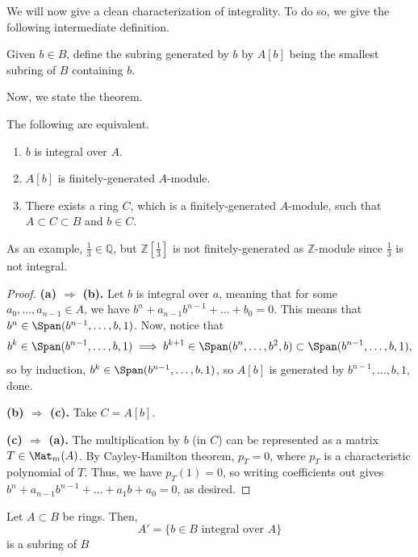 We will now give a clean characterization of integrality.
To do so, we give the following intermediate definition.
\begin{definition}
    Given $b\in B$, define the subring generated by $b$
    by $A[b]$ being the smallest subring of $B$ containing $b$.
\end{definition}
Now, we state the theorem.
\begin{theorem}
    \label{thm:integral_elements}
    The following are equivalent.
    \begin{enumerate}[label=(\alph*)]
	\item $b$ is integral over $A$.
	\item $A[b]$ is finitely-generated $A$-module.
	\item There exists a ring $C$, which is 
	    a finitely-generated $A$-module, such that
	    $A\subset C\subset B$ and $b\in C$.
    \end{enumerate}
\end{theorem}
As an example, $\frac 13\in\mathbb Q$,
but $\mathbb Z\left[\frac 13\right]$ is not
finitely-generated as $\mathbb Z$-module since $\frac 13$
is not integral.
\begin{proof}
    \textbf{(a) $\Rightarrow$ (b).}
    Let $b$ is integral over $a$,
    meaning that for some $a_0,\dots,a_{n-1}\in A$, we have
    $b^n+a_{n-1}b^{n-1}+\dots+b_0=0$.
    This means that $b^n\in\Span(b^{n-1},\dots,b,1)$.
    Now, notice that
    $$b^k\in\Span(b^{n-1},\dots,b,1)
    \implies b^{k+1}\in\Span(b^n,\dots,b^2,b)
    \subset \Span(b^{n-1},\dots,b,1),$$
    so by induction, $b^k\in\Span(b^{n-1},\dots,b,1)$,
    so $A[b]$ is generated by $b^{n-1},\dots,b,1$, done.

    \textbf{(b) $\Rightarrow$ (c).} Take $C=A[b]$.

    \textbf{(c) $\Rightarrow$ (a).}
    The multiplication by $b$ (in $C$)
    can be represented as a matrix $T\in\Mat_m(A)$.
    By Cayley-Hamilton theorem,
    $p_T=0$, where $p_T$ is a characteristic polynomial of $T$.
    Thus, we have $p_T(1)=0$,
    so writing coefficients out gives
    $b^n + a_{n-1}b^{n-1} + \dots + a_1b+a_0=0$,
    as desired.
\end{proof}
\begin{corollary}
    Let $A\subset B$ be rings.
    Then, 
    $$A' = \{b\in B\text{ integral over }A\}$$
    is a subring of $B$
\end{corollary}
